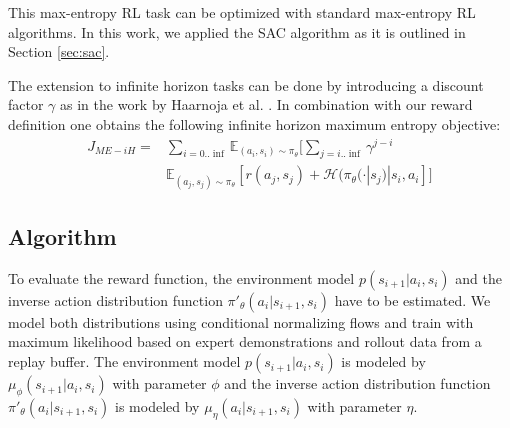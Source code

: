 \documentclass{article}
\begin{document}
This max-entropy RL task can be optimized with standard max-entropy RL algorithms. In this work, we applied the SAC algorithm \cite{haarnoja2018SAC} as it is outlined in Section \ref{sec:sac}. 

The extension to infinite horizon tasks can be done by introducing a discount factor $\gamma$ as in the work by Haarnoja et al. . In combination with our reward definition one obtains the following infinite horizon maximum entropy objective:
\begin{equation}
\begin{aligned}
J_{ME-iH} = & \sum_{i = 0..\inf}  \mathbb{E}_{(a_i,s_i) \sim \pi_{\theta}}[ \sum_{j = i..\inf} \gamma^{j-i} \\& \mathbb{E}_{(a_j,s_j) \sim \pi_{\theta}} [r(a_j, s_j) + \mathcal{H}(\pi_{\theta}(\cdot|s_j) | s_i, a_i] ]
\end{aligned}
\end{equation}

\subsection{Algorithm}
To evaluate the reward function, the environment model $p(s_{i+1}|a_i,s_i)$ and the inverse action distribution function $\pi'_{\theta}(a_{i}|s_{i+1},s_i)$ have to be estimated. We model both distributions using conditional normalizing flows and train with maximum likelihood based on expert demonstrations and rollout data from a replay buffer. The environment model $p(s_{i+1}|a_i,s_i)$ is modeled by $\mu_{\phi}(s_{i+1}|a_i,s_i)$ with parameter $\phi$ and the inverse action distribution function $\pi'_{\theta}(a_{i}|s_{i+1},s_i)$ is modeled by $\mu_{\eta}(a_{i}|s_{i+1},s_i)$ with parameter $\eta$. 
\end{document}

